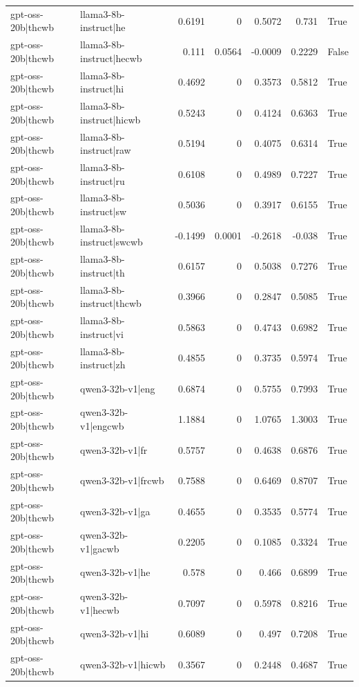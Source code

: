 \begin{table}
\begin{tabular}{l l r r r r l}
gpt-oss-20b|thcwb & llama3-8b-instruct|he & 0.6191 & 0 & 0.5072 & 0.731 & True \\
gpt-oss-20b|thcwb & llama3-8b-instruct|hecwb & 0.111 & 0.0564 & -0.0009 & 0.2229 & False \\
gpt-oss-20b|thcwb & llama3-8b-instruct|hi & 0.4692 & 0 & 0.3573 & 0.5812 & True \\
gpt-oss-20b|thcwb & llama3-8b-instruct|hicwb & 0.5243 & 0 & 0.4124 & 0.6363 & True \\
gpt-oss-20b|thcwb & llama3-8b-instruct|raw & 0.5194 & 0 & 0.4075 & 0.6314 & True \\
gpt-oss-20b|thcwb & llama3-8b-instruct|ru & 0.6108 & 0 & 0.4989 & 0.7227 & True \\
gpt-oss-20b|thcwb & llama3-8b-instruct|sw & 0.5036 & 0 & 0.3917 & 0.6155 & True \\
gpt-oss-20b|thcwb & llama3-8b-instruct|swcwb & -0.1499 & 0.0001 & -0.2618 & -0.038 & True \\
gpt-oss-20b|thcwb & llama3-8b-instruct|th & 0.6157 & 0 & 0.5038 & 0.7276 & True \\
gpt-oss-20b|thcwb & llama3-8b-instruct|thcwb & 0.3966 & 0 & 0.2847 & 0.5085 & True \\
gpt-oss-20b|thcwb & llama3-8b-instruct|vi & 0.5863 & 0 & 0.4743 & 0.6982 & True \\
gpt-oss-20b|thcwb & llama3-8b-instruct|zh & 0.4855 & 0 & 0.3735 & 0.5974 & True \\
gpt-oss-20b|thcwb & qwen3-32b-v1|eng & 0.6874 & 0 & 0.5755 & 0.7993 & True \\
gpt-oss-20b|thcwb & qwen3-32b-v1|engcwb & 1.1884 & 0 & 1.0765 & 1.3003 & True \\
gpt-oss-20b|thcwb & qwen3-32b-v1|fr & 0.5757 & 0 & 0.4638 & 0.6876 & True \\
gpt-oss-20b|thcwb & qwen3-32b-v1|frcwb & 0.7588 & 0 & 0.6469 & 0.8707 & True \\
gpt-oss-20b|thcwb & qwen3-32b-v1|ga & 0.4655 & 0 & 0.3535 & 0.5774 & True \\
gpt-oss-20b|thcwb & qwen3-32b-v1|gacwb & 0.2205 & 0 & 0.1085 & 0.3324 & True \\
gpt-oss-20b|thcwb & qwen3-32b-v1|he & 0.578 & 0 & 0.466 & 0.6899 & True \\
gpt-oss-20b|thcwb & qwen3-32b-v1|hecwb & 0.7097 & 0 & 0.5978 & 0.8216 & True \\
gpt-oss-20b|thcwb & qwen3-32b-v1|hi & 0.6089 & 0 & 0.497 & 0.7208 & True \\
gpt-oss-20b|thcwb & qwen3-32b-v1|hicwb & 0.3567 & 0 & 0.2448 & 0.4687 & True \\

\end{tabular}
\end{table}
